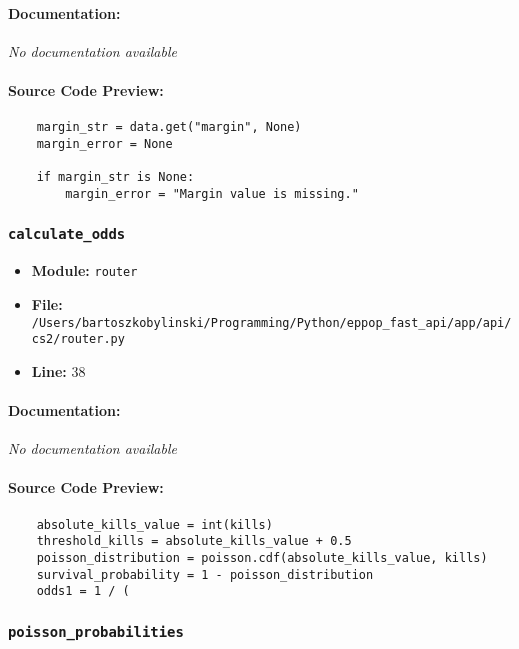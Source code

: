 \documentclass[11pt,a4paper]{article}
\begin{document}
\paragraph{Documentation:} \textit{No documentation available}

\paragraph{Source Code Preview:}
\begin{verbatim}
    margin_str = data.get("margin", None)
    margin_error = None

    if margin_str is None:
        margin_error = "Margin value is missing."
\end{verbatim}

\vspace{1em}
\subsubsection{\texttt{calculate\_odds}}

\begin{itemize}
    \item \textbf{Module:} \texttt{router}
    \item \textbf{File:} \texttt{/Users/bartoszkobylinski/Programming/Python/eppop\_fast\_api/app/api/cs2/router.py}
    \item \textbf{Line:} 38
\end{itemize}

\paragraph{Documentation:} \textit{No documentation available}

\paragraph{Source Code Preview:}
\begin{verbatim}
    absolute_kills_value = int(kills)
    threshold_kills = absolute_kills_value + 0.5
    poisson_distribution = poisson.cdf(absolute_kills_value, kills)
    survival_probability = 1 - poisson_distribution
    odds1 = 1 / (
\end{verbatim}

\vspace{1em}
\subsubsection{\texttt{poisson\_probabilities}}
\end{document}
